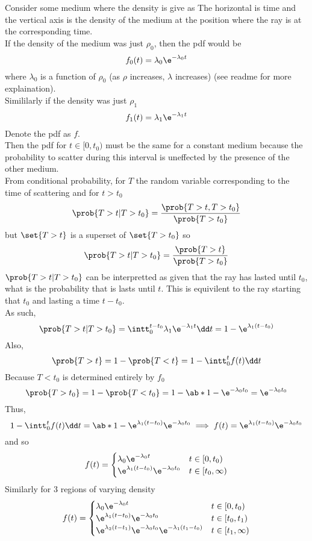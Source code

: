 \documentclass[12pt]{article}
\begin{document}

Consider some medium where the density is give as
The horizontal is time and the vertical axis is the density of the medium at the position where the ray is at the corresponding time.\\
If the density of the medium was just $\rho_0$, then the pdf would be 
\[f_0(t) = \lambda_0 \e^{-\lambda_0 t} \]
where $\lambda_0$ is a function of $\rho_0$ (as $\rho$ increases, $\lambda$ increases)
(see readme for more explaination).\\ 
Simililarly if the density was just $\rho_1$
\[f_1(t) = \lambda_1 \e^{-\lambda_1 t} \] 
%
Denote the pdf as $f$.\\ 
Then the pdf for $t\in[0,t_0)$ must be the same for a constant medium because the probability to scatter during this interval is uneffected by the presence of the other medium.\\ 
From conditional probability\cite{1}, for $T$ the random variable corresponding to the time of scattering and for $t>t_0$
\[\prob{T>t|T>t_0} = \frac{\prob{T>t, T>t_0}}{\prob{T>t_0}}\] 
but $\set{T>t}$ is a superset of $\set{T>t_0}$ so 
\[\prob{T>t|T>t_0} = \frac{\prob{T>t}}{\prob{T>t_0}}\] 
$\prob{T>t|T>t_0}$ can be interpretted as given that the ray has lasted until $t_0$, what is the probability that is lasts until $t$.
This is equivilent to the ray starting that $t_0$ and lasting a time $t - t_0$.\\ 
As such, 
\[\prob{T>t|T>t_0} = \intt_0^{t-t_0} \lambda_1 \e^{-\lambda_1 t} \dd t = 1 - \e^{\lambda_1 (t-t_0)}\] 
Also, 
\[ \prob{T>t} = 1 - \prob{T<t} = 1 - \intt_0^t f(t) \dd t\] 
Because $T<t_0$ is determined entirely by $f_0$
\[\prob{T>t_0} = 1 - \prob{T<t_0} = 1 - \ab*{1 - \e^{-\lambda_0 t_0}} = \e^{-\lambda_0 t_0}\]
%
Thus,
\[1 - \intt_0^t f(t) \dd t = \ab*{1 - \e^{\lambda_1 (t-t_0)}}\e^{-\lambda_0 t_0} \implies f(t) = \e^{\lambda_1 (t-t_0)}\e^{-\lambda_0 t_0}\] 
and so 
\[ f(t) = \begin{cases}
  \lambda_0 \e^{-\lambda_0 t} & t\in[0,t_0)\\ 
  \e^{\lambda_1 (t-t_0)}\e^{-\lambda_0 t_0} & t\in[t_0,\infty)
\end{cases}\]
%
Similarly for 3 regions of varying density 
\[ f(t) = \begin{cases}
  \lambda_0 \e^{-\lambda_0 t} & t\in[0,t_0)\\ 
  \e^{\lambda_1 (t-t_0)}\e^{-\lambda_0 t_0} & t\in[t_0,t_1)\\
  \e^{\lambda_2 (t-t_1)}\e^{-\lambda_0 t_0}\e^{-\lambda_1(t_1-t_0)} & t\in[t_1,\infty)
\end{cases}\]
\end{document}
